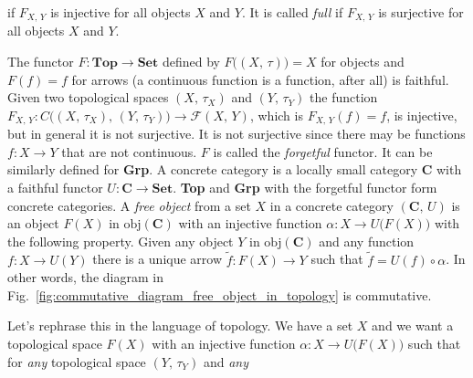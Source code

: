 \documentclass{article}
\theoremstyle{plain}
\theoremstyle{normal}
\newenvironment{example}{%
    \pushQED{\qed}\renewcommand{\qedsymbol}{$\blacksquare$}\examplex%
}{%
    \popQED\endexamplex%
}
\begin{document}
            if $F_{X,\,Y}$ is injective for all
            objects $X$ and $Y$. It is called \textit{full}%
            if $F_{X,\,Y}$ is surjective for all objects $X$ and $Y$.
            \begin{example}
                The functor $F:\mathbf{Top}\rightarrow\mathbf{Set}$ defined by
                $F\big((X,\,\tau)\big)=X$ for objects and $F(f)=f$ for arrows
                (a continuous function is a function, after all) is faithful.
                Given two topological spaces $(X,\,\tau_{X})$ and $(Y,\,\tau_{Y})$
                the function
                $F_{X,\,Y}:C\big((X,\,\tau_{X}),\,(Y,\,\tau_{Y})\big)\rightarrow\mathcal{F}(X,\,Y)$,
                which is $F_{X,\,Y}(f)=f$, is injective, but in general it is not
                surjective. It is not surjective since there may be functions
                $f:X\rightarrow{Y}$ that are not continuous. $F$ is called the
                \textit{forgetful} functor.%
                It can be similarly defined for \textbf{Grp}.
            \end{example}
            A concrete category%
            is a locally small category $\mathbf{C}$ with a faithful
            functor $U:\mathbf{C}\rightarrow\mathbf{Set}$. \textbf{Top} and
            \textbf{Grp} with the forgetful functor form concrete categories.
            A \textit{free object}
            from a set $X$ in a concrete category
            $(\mathbf{C},\,U)$ is an object $F(X)$ in $\textrm{obj}(\mathbf{C})$
            with an injective function $\alpha:X\rightarrow{U}\big(F(X)\big)$
            with the following property. Given any object $Y$ in
            $\textrm{obj}(\mathbf{C})$ and any function $f:X\rightarrow{U}(Y)$
            there is a unique arrow $\tilde{f}:F(X)\rightarrow{Y}$ such that
            $\tilde{f}=U(f)\circ\alpha$. In other words, the diagram
            in Fig.~\ref{fig:commutative_diagram_free_object_in_topology} is
            commutative.
            \par\hfill\par
            Let's rephrase this in the language of topology. We have a set $X$
            and we want a topological space $F(X)$ with an injective
            function $\alpha:X\rightarrow{U}\big(F(X)\big)$ such that for
            \textit{any} topological space $(Y,\,\tau_{Y})$ and \textit{any}
\end{document}
